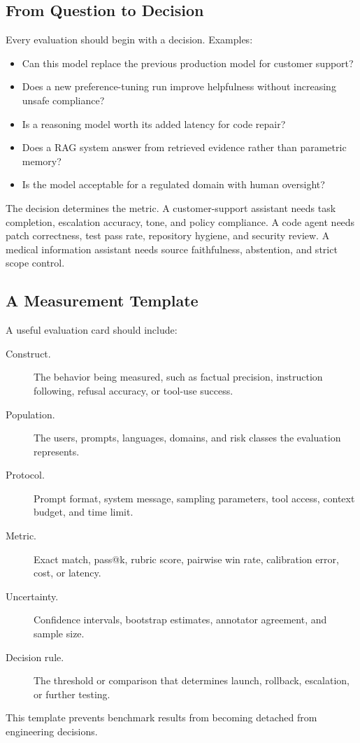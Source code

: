 \subsection{From Question to Decision}
Every evaluation should begin with a decision. Examples:
\begin{itemize}
    \item Can this model replace the previous production model for customer support?
    \item Does a new preference-tuning run improve helpfulness without increasing unsafe compliance?
    \item Is a reasoning model worth its added latency for code repair?
    \item Does a RAG system answer from retrieved evidence rather than parametric memory?
    \item Is the model acceptable for a regulated domain with human oversight?
\end{itemize}
The decision determines the metric. A customer-support assistant needs task completion, escalation accuracy, tone, and policy compliance. A code agent needs patch correctness, test pass rate, repository hygiene, and security review. A medical information assistant needs source faithfulness, abstention, and strict scope control.

\subsection{A Measurement Template}
A useful evaluation card should include:
\begin{description}
    \item[Construct.] The behavior being measured, such as factual precision, instruction following, refusal accuracy, or tool-use success.
    \item[Population.] The users, prompts, languages, domains, and risk classes the evaluation represents.
    \item[Protocol.] Prompt format, system message, sampling parameters, tool access, context budget, and time limit.
    \item[Metric.] Exact match, pass@k, rubric score, pairwise win rate, calibration error, cost, or latency.
    \item[Uncertainty.] Confidence intervals, bootstrap estimates, annotator agreement, and sample size.
    \item[Decision rule.] The threshold or comparison that determines launch, rollback, escalation, or further testing.
\end{description}
This template prevents benchmark results from becoming detached from engineering decisions.

